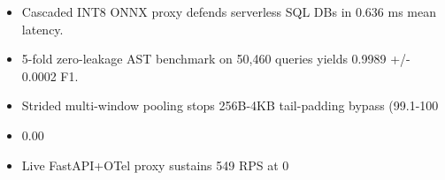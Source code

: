 \begin{itemize}
  \item Cascaded INT8 ONNX proxy defends serverless SQL DBs in 0.636 ms mean latency.
  \item 5-fold zero-leakage AST benchmark on 50,460 queries yields 0.9989 +/- 0.0002 F1.
  \item Strided multi-window pooling stops 256B-4KB tail-padding bypass (99.1-100%
  \item 0.00%
  \item Live FastAPI+OTel proxy sustains 549 RPS at 0%
\end{itemize}
